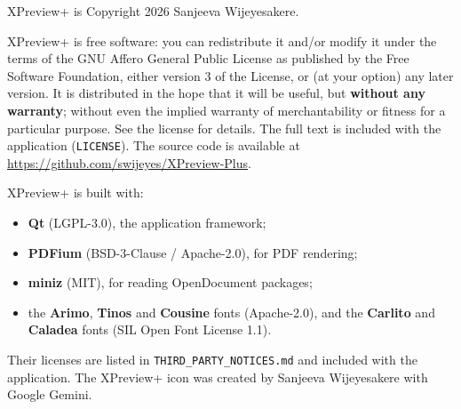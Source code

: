 \documentclass[11pt,a4paper]{article}
\newcommand{\app}{XPreview+}
\newcommand{\file}[1]{\texttt{#1}}
\begin{document}
\app{} is Copyright \textcopyright{} 2026 Sanjeeva Wijeyesakere.

\app{} is free software: you can redistribute it and/or modify it under the terms of the GNU
Affero General Public License as published by the Free Software Foundation, either version 3 of
the License, or (at your option) any later version. It is distributed in the hope that it will be
useful, but \textbf{without any warranty}; without even the implied warranty of merchantability or
fitness for a particular purpose. See the license for details. The full text is included with the
application (\file{LICENSE}). The source code is available at
\url{https://github.com/swijeyes/XPreview-Plus}.

\app{} is built with:
\begin{itemize}
  \item \textbf{Qt} (LGPL-3.0), the application framework;
  \item \textbf{PDFium} (BSD-3-Clause / Apache-2.0), for PDF rendering;
  \item \textbf{miniz} (MIT), for reading OpenDocument packages;
  \item the \textbf{Arimo}, \textbf{Tinos} and \textbf{Cousine} fonts (Apache-2.0), and the
        \textbf{Carlito} and \textbf{Caladea} fonts (SIL Open Font License 1.1).
\end{itemize}
Their licenses are listed in \file{THIRD\_PARTY\_NOTICES.md} and included with the application.
The \app{} icon was created by Sanjeeva Wijeyesakere with Google Gemini.
\end{document}
